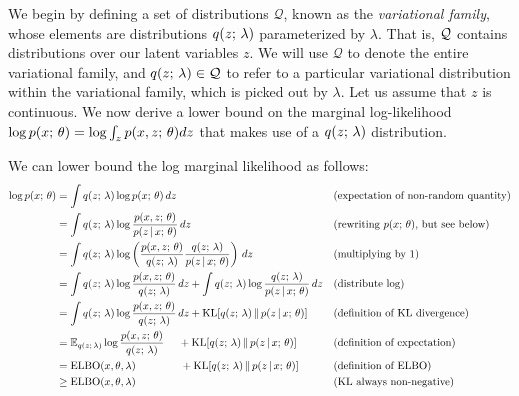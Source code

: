 \documentclass{article}
\begin{document}
We begin by defining
a set of distributions $\mathcal{Q}$, known as the \textit{variational family}, whose elements are 
distributions $q(z ; \, \lambda)$ parameterized by $\lambda$. That is, $\mathcal{Q}$ contains distributions over our latent variables $z$.
We will use $\mathcal{Q}$ to denote the entire variational family, and $q(z ; \, \lambda) \in \mathcal{Q}$
to refer to a particular variational distribution within the variational family, which is picked out by $\lambda$.
Let us assume that $z$ is continuous. We now derive a lower bound on the marginal log-likelihood $\log p(x ; \, \theta) = \log \int_z p(x, z ; \, \theta) dz$ that makes use of a $q(z ; \, \lambda)$ distribution.

We can lower bound the log marginal likelihood as follows:
\begin{align*}
\log p(x ; \, \theta) &= \int q(z ; \, \lambda) \log p(x ; \, \theta) \, dz && \text{(expectation of non-random quantity)} \\
&= \int q(z ; \, \lambda) \log \frac{p(x, z ; \, \theta)}{p(z \,|\, x ; \, \theta)} \, dz && \text{(rewriting $p(x; \, \theta)$, but see below)} \\
&= \int q(z ; \, \lambda) \log \left( \frac{p(x, z ; \, \theta)}{q(z ; \, \lambda)} \frac{q(z ; \, \lambda)}{p(z \,|\, x ; \, \theta)} \right) \, dz && \text{(multiplying by 1)} \\
&= \int  q(z ; \, \lambda) \log \frac{p(x, z ; \, \theta)}{q(z ; \, \lambda)} \, dz + \int q(z ; \, \lambda)  \log \frac{q(z ; \, \lambda)}{p(z \,|\, x ; \, \theta)} \, dz && \text{(distribute $\log$)} \\
&= \int q(z ; \, \lambda) \log \frac{p(x, z ; \, \theta)}{q(z ; \, \lambda)} \, dz + \operatorname*{KL}[q(z ; \, \lambda)  \, \Vert \, p(z \,|\, x ; \, \theta)]  && \text{(definition of KL divergence)} \\
&= \mathbb{E}_{q(z ; \, \lambda)} \log \frac{p(x, z ; \, \theta)}{q(z ; \, \lambda)} \quad \ + \operatorname*{KL}[q(z ; \, \lambda)  \, \Vert \, p(z \,|\, x ; \, \theta)] && \text{(definition of expectation)} \\
&= \operatorname*{ELBO}(x, \theta, \lambda) \qquad \qquad  \, + \operatorname*{KL}[q(z ; \, \lambda)  \, \Vert \, p(z \,|\, x ; \, \theta)] && \text{(definition of ELBO)} \\
&\geq \operatorname*{ELBO}(x, \theta, \lambda) && \text{(KL always non-negative)}
\end{align*}
\end{document}
